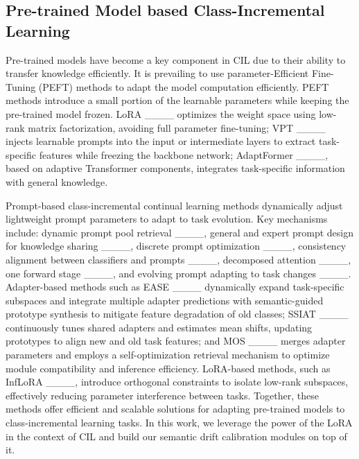 \subsection{Pre-trained Model based Class-Incremental Learning}
Pre-trained models have become a key component in CIL due to their ability to transfer knowledge efficiently. It is prevailing to use parameter-Efficient Fine-Tuning (PEFT) methods to adapt the model computation efficiently. PEFT methods introduce a small portion of the learnable parameters while keeping the pre-trained model frozen. LoRA ____ optimizes the weight space using low-rank matrix factorization, avoiding full parameter fine-tuning; VPT ____ injects learnable prompts into the input or intermediate layers to extract task-specific features while freezing the backbone network; AdaptFormer ____, based on adaptive Transformer components, integrates task-specific information with general knowledge. 

Prompt-based class-incremental continual learning methods dynamically adjust lightweight prompt parameters to adapt to task evolution. Key mechanisms include: dynamic prompt pool retrieval ____, general and expert prompt design for knowledge sharing ____, discrete prompt optimization ____, consistency alignment between classifiers and prompts ____, decomposed attention ____, one forward stage ____, and evolving prompt adapting to task changes ____.  Adapter-based methods such as EASE ____ dynamically expand task-specific subspaces and integrate multiple adapter predictions with semantic-guided prototype synthesis to mitigate feature degradation of old classes; SSIAT ____ continuously tunes shared adapters and estimates mean shifts, updating prototypes to align new and old task features; and MOS ____ merges adapter parameters and employs a self-optimization retrieval mechanism to optimize module compatibility and inference efficiency.  LoRA-based methods, such as InfLoRA ____, introduce orthogonal constraints to isolate low-rank subspaces, effectively reducing parameter interference between tasks. Together, these methods offer efficient and scalable solutions for adapting pre-trained models to class-incremental learning tasks. In this work, we leverage the power of the LoRA in the context of CIL and build our semantic drift calibration modules on top of it.